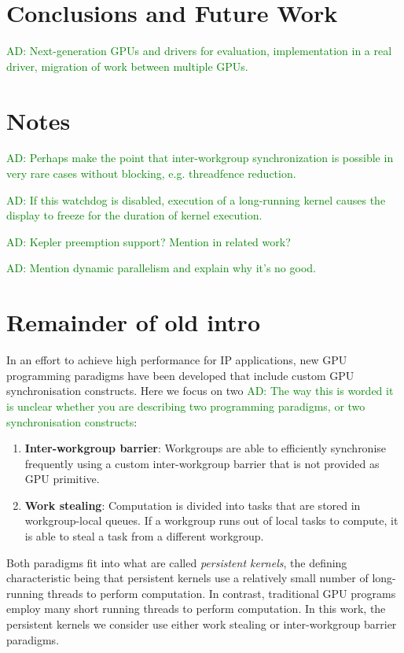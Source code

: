 \documentclass[nocopyrightspace]{sigplanconf-pldi16}
\newcommand{\ADComment}[1]{\textcolor{green}{AD: #1}}
\begin{document}
\section{Conclusions and Future Work}\label{sec:conclusion}

\ADComment{Next-generation GPUs and drivers for evaluation,
  implementation in a real driver, migration of work between multiple
  GPUs.}

\section{Notes}

  \ADComment{Perhaps
  make the point that inter-workgroup synchronization is possible in
  very rare cases without blocking, e.g. threadfence reduction.}

\ADComment{If this watchdog is disabled,
execution of a long-running kernel causes the display to freeze for
the duration of kernel execution.}

\ADComment{Kepler preemption support?  Mention in related work?}

\ADComment{Mention dynamic parallelism and explain why it's no good.}

\section{Remainder of old intro}

In an effort to achieve high performance for IP applications, new GPU
programming paradigms have been developed that include custom GPU
synchronisation constructs. Here we focus on two \ADComment{The way this is worded it is unclear whether you are describing two programming paradigms, or two synchronisation constructs}:

\begin{enumerate}
\item {\bf Inter-workgroup barrier}: Workgroups are able to
  efficiently synchronise frequently using a custom inter-workgroup
  barrier that is not provided as GPU primitive.

\item {\bf Work stealing}: Computation is divided into tasks that are
  stored in workgroup-local queues. If a workgroup runs out of local
  tasks to compute, it is able to steal a task from a different
  workgroup.
\end{enumerate}

Both paradigms fit into what are called \emph{persistent kernels}, the
defining characteristic being that persistent kernels use a relatively
small number of long-running threads to perform computation. In
contrast, traditional GPU programs employ many short running threads
to perform computation. In this work, the persistent kernels we consider
use either work stealing or inter-workgroup barrier paradigms.
\end{document}
